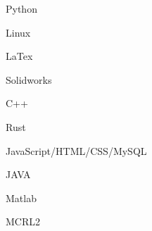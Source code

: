 \vspace{0.4cm}
\begin{cSection}{\textwidth}{0.47\textwidth}{0.48\textwidth}
{%
\begin{cSubsection}{}
  \begin{experienceItem} {}{Python}{}{} \end{experienceItem}
  \begin{experienceItem} {\hphantom{}}{Linux}{}{} \end{experienceItem}
  \begin{experienceItem} {\hphantom{}}{LaTex}{}{} \end{experienceItem}
  \begin{experienceItem} {\hphantom{}}{Solidworks}{}{} \end{experienceItem}

  \begin{experienceItem} {}{C++}{}{} \end{experienceItem}
  \begin{experienceItem} {\hphantom{}}{Rust}{}{} \end{experienceItem}
  \begin{experienceItem} {\hphantom{}}{JavaScript/HTML/CSS/MySQL}{}{} \end{experienceItem}
  \begin{experienceItem} {\hphantom{}}{JAVA}{}{} \end{experienceItem}
  \begin{experienceItem} {\hphantom{}}{Matlab}{}{} \end{experienceItem}
  \begin{experienceItem} {\hphantom{}}{MCRL2}{}{} \end{experienceItem}
\end{cSubsection}

}
\end{cSection}
